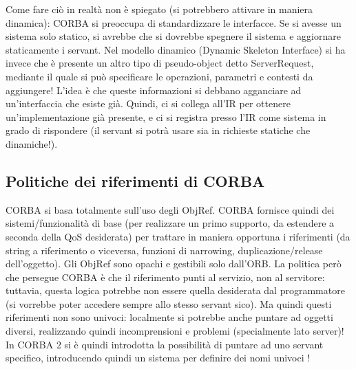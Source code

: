 Come fare ciò in realtà non è spiegato (si potrebbero attivare in maniera dinamica): CORBA si preoccupa di 
standardizzare le interfacce. Se si avesse un sistema solo statico, si avrebbe che si dovrebbe spegnere il sistema e 
aggiornare staticamente i servant.
Nel modello dinamico (Dynamic Skeleton Interface) si ha invece che è presente un altro tipo di pseudo-object detto 
ServerRequest, mediante il quale si può specificare le operazioni, parametri e contesti da aggiungere! L'idea è che 
queste informazioni si debbano agganciare ad un'interfaccia che esiste già. Quindi, ci si collega all'IR per ottenere 
un'implementazione già presente, e ci si registra presso l'IR come sistema in grado di rispondere (il servant si potrà 
usare sia in richieste statiche che dinamiche!).
\subsection{Politiche dei riferimenti di CORBA}
CORBA si basa totalmente sull'uso degli ObjRef. CORBA fornisce quindi dei
sistemi/funzionalità di base (per realizzare un primo supporto, da estendere a
seconda della QoS desiderata) per trattare in maniera opportuna i riferimenti
(da string a riferimento o viceversa, funzioni di narrowing, duplicazione/release
dell'oggetto). Gli ObjRef sono opachi e gestibili solo dall'ORB.
La politica però che persegue CORBA è che il riferimento punti al servizio,
non al servitore: tuttavia, questa logica potrebbe non essere quella desiderata dal programmatore (si vorrebbe poter
accedere sempre allo stesso servant
sico). Ma quindi questi riferimenti non sono univoci: localmente si potrebbe
anche puntare ad oggetti diversi, realizzando quindi incomprensioni e problemi
(specialmente lato server)!
In CORBA 2 si è quindi introdotta la possibilità di puntare ad uno servant
specifico, introducendo quindi un sistema per definire dei nomi univoci !
